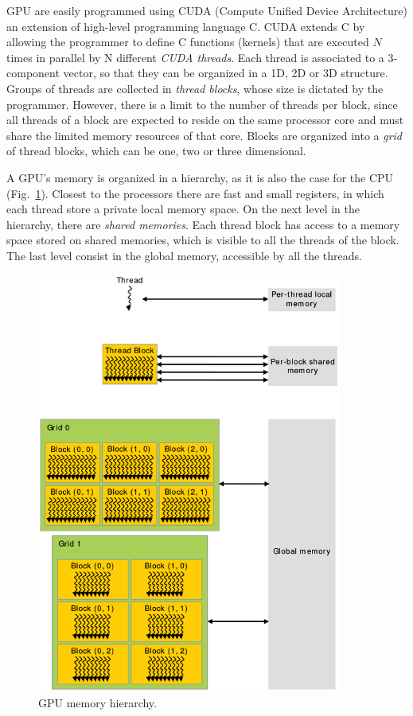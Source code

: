 GPU are easily programmed using CUDA (Compute Unified Device Architecture) an extension of high-level programming language C. CUDA extends C by allowing the programmer to define C functions (kernels) that are executed $N$ times in parallel by N different \textit{CUDA threads}. Each thread is associated to a 3-component vector, so that they can be organized in a 1D, 2D or 3D structure. Groups of threads are collected in \textit{thread blocks}, whose size is dictated by the programmer. However, there is a limit to the number of threads per block, since all threads of a block are expected to reside on the same processor core and must share the limited memory resources of that core. Blocks are organized into a \textit{grid} of thread blocks, which can be one, two or three dimensional.

A GPU's memory is organized in a hierarchy, as it is also the case for the CPU (Fig.~\ref{fig:GPU-memory-hierarchy}). Closest to the processors there are fast and small registers, in which each thread store a private local memory space. On the next level in the hierarchy, there are \textit{shared memories}. Each thread block has access to a memory space stored on shared memories, which is visible to all the threads of the block. The last level consist in the global memory, accessible by all the threads.
\begin{figure}
   \centering
   \includegraphics[width=10cm]{Figs/GPU_memory_hierarchy.eps}
   \caption{GPU memory hierarchy.} \label{fig:GPU-memory-hierarchy}
\end{figure}

